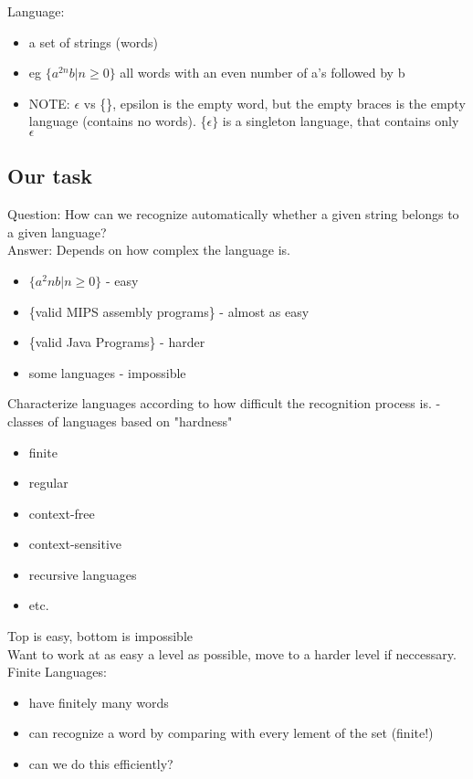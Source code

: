 \documentclass[12pt]{article}
\begin{document}
	Language:
	\begin{itemize}
		\item a set of strings (words)
		\item eg $\{a^{2n}b | n \geq 0\}$ all words with an even number of a's followed by b
		\item NOTE: $\epsilon$ vs \{\}, epsilon is the empty word, but the empty braces is the empty language (contains no words). \{$\epsilon\}$ is a singleton language, that contains only $\epsilon$
	\end{itemize}
	
	\subsection*{Our task}
	Question: How can we recognize automatically whether a given string belongs to a given language?\\
	
	Answer: Depends on how complex the language is.\\
	\begin{itemize}
		\item $\{a^2n b | n \geq 0\}$ - easy
		\item \{valid MIPS assembly programs\} - almost as easy
		\item \{valid Java Programs\} - harder
		\item some languages - impossible
	\end{itemize}
	
	Characterize languages according to how difficult the recognition process is. - classes of languages based on "hardness"\\
	\begin{itemize}
		\item finite
		\item regular
		\item context-free
		\item context-sensitive
		\item recursive languages
		\item etc.
	\end{itemize}
	Top is easy, bottom is impossible\\
	
	Want to work at as easy a level as possible, move to a harder level if neccessary.\\
	
	Finite Languages:
	\begin{itemize}
		\item have finitely many words
		\item can recognize a word by comparing with every lement of the set (finite!)
		\item can we do this efficiently?
	\end{itemize}
	
\end{document}
